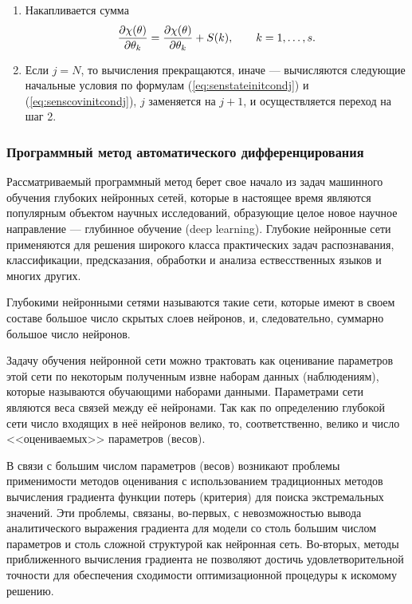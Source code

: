 \documentclass[a4paper,14pt]{extarticle}
\let\oldref\ref
\renewcommand{\ref}[1]{(\oldref{#1})}
\begin{document}
\begin{enumerate}
\item Накапливается сумма
\[
	\frac{\partial \chi(\theta)}{\partial \theta_k} = \frac{\partial \chi(\theta)}{\partial \theta_k} + S(k),
		\qquad k = 1, \ldots, s.
\]

\item Если $j = N$, то вычисления прекращаются, иначе --- вычисляются следующие
начальные условия по формулам \ref{eq:senstateinitcondj} и
\ref{eq:senscovinitcondj}, $j$ заменяется на $j + 1$, и осуществляется переход
на шаг 2.

\end{enumerate}

\subsubsection{Программный метод автоматического дифференцирования}

Рассматриваемый программный метод берет свое начало из задач машинного обучения
глубоких нейронных сетей, которые в настоящее время являются популярным
объектом научных исследований, образующие целое новое научное направление ---
глубинное обучение (deep learning). Глубокие нейронные сети применяются для
решения широкого класса практических задач распознавания, классификации,
предсказания, обработки и анализа ествесственных языков и многих других.

Глубокими нейронными сетями называются такие сети, которые имеют в своем
составе большое число скрытых слоев нейронов, и, следовательно, суммарно
большое число нейронов.

Задачу обучения нейронной сети можно трактовать как оценивание параметров этой
сети по некоторым полученным извне наборам данных (наблюдениям), которые
называются обучающими наборами данными. Параметрами сети являются веса связей
между её нейронами. Так как по определению глубокой сети число входящих в неё
нейронов велико, то, соответственно, велико и число <<оцениваемых>> параметров
(весов).

В связи с большим числом параметров (весов) возникают проблемы применимости
методов оценивания с использованием традиционных методов вычисления градиента
функции потерь (критерия) для поиска экстремальных значений. Эти проблемы,
связаны, во-первых, с невозможностью вывода аналитического выражения градиента
для модели со столь большим числом параметров и столь сложной структурой как
нейронная сеть. Во-вторых, методы приближенного вычисления градиента не
позволяют достичь удовлетворительной точности для обеспечения сходимости
оптимизационной процедуры к искомому решению.
\end{document}
